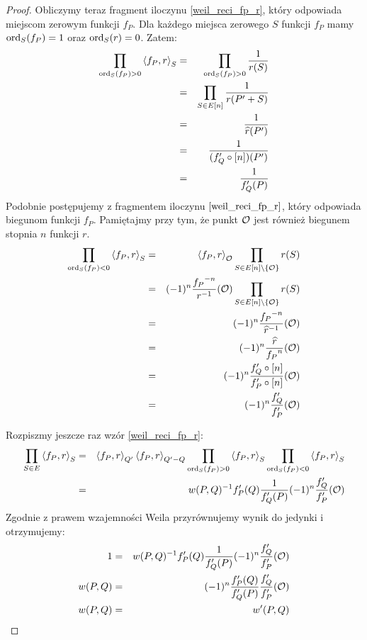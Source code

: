\begin{proof}
Obliczymy teraz fragment iloczynu \ref{weil_reci_fp_r},
który odpowiada miejscom zerowym funkcji $f_P$.
Dla każdego miejsca zerowego $S$ funkcji $f_P$
mamy $\operatorname{ord}_S(f_P) = 1$ oraz $\operatorname{ord}_S(r) = 0$.
Zatem:
\begin{eqnarray*}
\prod_{\operatorname{ord}_S(f_P) > 0} \left\langle f_P , r \right\rangle_{S}
& = & \prod_{\operatorname{ord}_S(f_P) > 0} \frac{1}{r(S)} \\
& = & \prod_{S \in E[n]} \frac{1}{r(P' + S)} \\
& = & \frac{1}{\widehat{r}(P')} \\
& = & \frac{1}{(f_Q' \circ [n])(P')} \\
& = & \frac{1}{f_Q'(P)}
\end{eqnarray*}
Podobnie postępujemy z fragmentem iloczynu $\ref{weil_reci_fp_r}$,
który odpowiada biegunom funkcji $f_P$. Pamiętajmy przy tym,
że punkt $\mathcal{O}$ jest również biegunem stopnia $n$ funkcji $r$.
\begin{eqnarray*}
\prod_{\operatorname{ord}_S(f_P) < 0} \left\langle f_P , r \right\rangle_{S}
& = & \left\langle f_P , r \right\rangle_{\mathcal{O}}
      \prod_{S \in E[n] \setminus \{\mathcal{O}\}} r(S) \\
& = & (-1)^{n}\frac{{f_P}^{-n}}{r^{-1}}(\mathcal{O})
      \prod_{S \in E[n] \setminus \{\mathcal{O}\}} r(S) \\
& = & (-1)^{n}\frac{{f_P}^{-n}}{\widehat{r}^{-1}}(\mathcal{O}) \\
& = & (-1)^{n}\frac{\widehat{r}}{{f_P}^n}(\mathcal{O}) \\
& = & (-1)^{n}\frac{f_Q' \circ [n]}{f_P' \circ [n]}(\mathcal{O}) \\
& = & (-1)^{n}\frac{f_Q'}{f_P'}(\mathcal{O})
\end{eqnarray*}

Rozpiszmy jeszcze raz wzór \ref{weil_reci_fp_r}:
\begin{eqnarray*}
\prod_{S \in E} \left\langle f_P , r \right\rangle_{S}
& = & \left\langle f_P , r \right\rangle_{Q'} \left\langle f_P , r \right\rangle_{Q' - Q}
      \prod_{\operatorname{ord}_S(f_P) > 0} \left\langle f_P , r \right\rangle_{S}
      \prod_{\operatorname{ord}_S(f_P) < 0} \left\langle f_P , r \right\rangle_{S} \\
& = & w(P, Q)^{-1} f_P'(Q) \frac{1}{f_Q'(P)} (-1)^n\frac{f_Q'}{f_P'}(\mathcal{O})
\end{eqnarray*}
Zgodnie z prawem wzajemności Weila przyrównujemy wynik do jedynki
i otrzymujemy:
\begin{eqnarray*}
1
& = &
w(P, Q)^{-1} f_P'(Q) \frac{1}{f_Q'(P)} (-1)^n\frac{f_Q'}{f_P'}(\mathcal{O})
\\
w(P, Q)
& = &
(-1)^n \frac{f_P'(Q)}{f_Q'(P)} \frac{f_Q'}{f_P'}(\mathcal{O})
\\
w(P, Q)
& = &
w'(P, Q)
\end{eqnarray*}
\end{proof}
